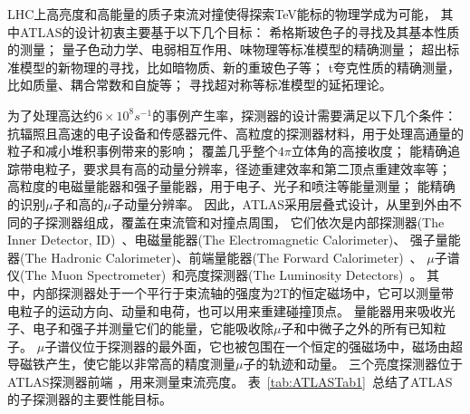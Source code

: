 LHC上高亮度和高能量的质子束流对撞使得探索TeV能标的物理学成为可能，
其中ATLAS的设计初衷主要基于以下几个目标：
希格斯玻色子的寻找及其基本性质的测量；
量子色动力学、电弱相互作用、味物理等标准模型的精确测量；
超出标准模型的新物理的寻找，比如暗物质、新的重玻色子等；
t夸克性质的精确测量，比如质量、耦合常数和自旋等；
寻找超对称等标准模型的延拓理论。

为了处理高达约$6\times10^8s^{-1}$的事例产生率，探测器的设计需要满足以下几个条件：
抗辐照且高速的电子设备和传感器元件、高粒度的探测器材料，用于处理高通量的粒子和减小堆积事例带来的影响；
覆盖几乎整个$4\pi$立体角的高接收度；
能精确追踪带电粒子，要求具有高的动量分辨率，径迹重建效率和第二顶点重建效率等；
高粒度的电磁量能器和强子量能器，用于电子、光子和喷注等能量测量；
能精确的识别$\mu$子和高的$\mu$子动量分辨率。
因此，ATLAS采用层叠式设计，从里到外由不同的子探测器组成，覆盖在束流管和对撞点周围，
它们依次是内部探测器(The Inner Detector, ID)~\cite{ATLASINNER}、电磁量能器(The Electromagnetic Calorimeter)、
强子量能器(The Hadronic Calorimeter)、前端量能器(The Forward Calorimeter)~\cite{ATLASLACA,ATLASTCA}、
$\mu$子谱仪(The Muon Spectrometer)~\cite{ATLASMUSPEC}和亮度探测器(The Luminosity Detectors)~\cite{ATLASLUMID}。
其中，内部探测器处于一个平行于束流轴的强度为2T的恒定磁场中，它可以测量带电粒子的运动方向、动量和电荷，也可以用来重建碰撞顶点。
量能器用来吸收光子、电子和强子并测量它们的能量，它能吸收除$\mu$子和中微子之外的所有已知粒子。
$\mu$子谱仪位于探测器的最外面，它也被包围在一个恒定的强磁场中，磁场由超导磁铁产生，使它能以非常高的精度测量$\mu$子的轨迹和动量。
三个亮度探测器位于ATLAS探测器前端
，用来测量束流亮度。
表~\ref{tab:ATLASTab1}~总结了ATLAS的子探测器的主要性能目标。

